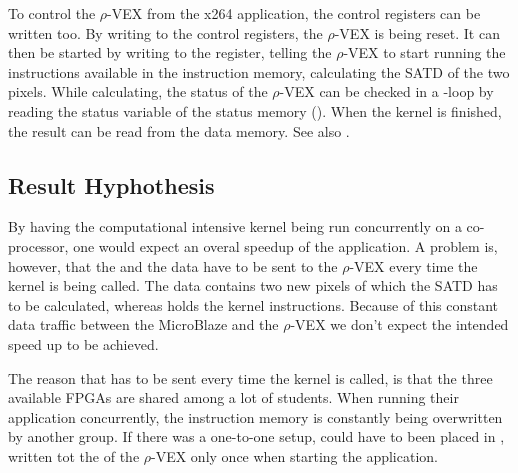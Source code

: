 To control the $\rho$-VEX from the x264 application, the control registers can be written too. By writing  to the control registers, the $\rho$-VEX is being reset. It can then be started by writing  to the register, telling the $\rho$-VEX to start running the instructions available in the instruction memory, calculating the SATD of the two pixels. While calculating, the status of the $\rho$-VEX can be checked in a -loop by reading the status variable of the status memory (). When the kernel is finished, the result can be read from the data memory. See also .

\subsection{Result Hyphothesis}

By having the computational intensive kernel being run concurrently on a co-processor, one would expect an overal speedup of the application. A problem is, however, that the  and the data have to be sent to the $\rho$-VEX every time the kernel is being called. The data contains two new pixels of which the SATD has to be calculated, whereas  holds the kernel instructions. Because of this constant data traffic between the MicroBlaze and the $\rho$-VEX we don't expect the intended speed up to be achieved.

The reason that  has to be sent every time the kernel is called, is that the three available FPGAs are shared among a lot of students. When running their application concurrently, the instruction memory is constantly being overwritten by another group. If there was a one-to-one setup,  could have to been placed in , written tot the  of the $\rho$-VEX only once when starting the application. 


